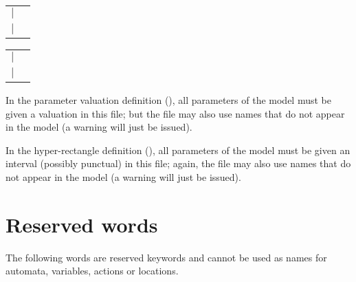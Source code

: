 \begin{tabular}{l l}
	$|$ & \styleIMI{, }  \\
	$|$ & \emptystring{} \\
\end{tabular}


\begin{tabular}{l l}
	$|$ & \styleIMI{;}   \\
	$|$ & \emptystring{} \\
\end{tabular}





\begin{remark}
	In the parameter valuation definition (), all parameters of the model must be given a valuation in this file; but the file may also use names that do not appear in the model (a warning will just be issued).
\end{remark}

\begin{remark}
	In the hyper-rectangle definition (), all parameters of the model must be given an interval (possibly punctual) in this file; again, the file may also use names that do not appear in the model (a warning will just be issued).
\end{remark}





\section{Reserved words}

The following words are reserved keywords and cannot be used as names for automata, variables, actions or locations.

